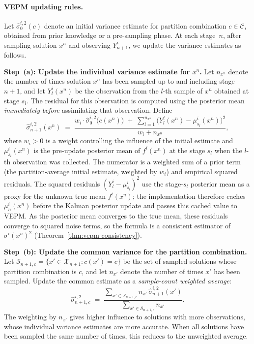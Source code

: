 \documentclass[12pt]{article}
\theoremstyle{plain}
\theoremstyle{definition}
\theoremstyle{remark}
\begin{document}
\paragraph{VEPM updating rules.}
Let $\hat{\sigma}^{i,2}_0(c)$ denote an initial variance estimate for partition combination $c \in \mathcal{C}$, obtained from prior knowledge or a pre-sampling phase. At each stage~$n$, after sampling solution $x^n$ and observing $Y^i_{n+1}$, we update the variance estimates as follows.

\medskip
\noindent\textbf{Step~(a): Update the individual variance estimate for $x^n$.} Let $n_{x^n}$ denote the number of times solution $x^n$ has been sampled up to and including stage $n+1$, and let $Y^i_l(x^n)$ be the observation from the $l$-th sample of $x^n$ obtained at stage $s_l$.  The residual for this observation is computed using the posterior mean \emph{immediately before} assimilating that observation.  Define
\begin{equation}\label{eq:VEPM_individual}
  \hat{\sigma}^{i,2}_{n+1}(x^n) \;=\; \frac{w_i \cdot \hat{\sigma}^{i,2}_0\bigl(c(x^n)\bigr) \;+\; \displaystyle\sum_{l=1}^{n_{x^n}} \bigl(Y^i_l(x^n) - \mu^i_{s_l}(x^n)\bigr)^2}{w_i + n_{x^n}},
\end{equation}
where $w_i > 0$ is a weight controlling the influence of the initial estimate and $\mu^i_{s_l}(x^n)$ is the pre-update posterior mean of $f^i(x^n)$ at the stage $s_l$ when the $l$-th observation was collected.  The numerator is a weighted sum of a prior term (the partition-average initial estimate, weighted by $w_i$) and empirical squared residuals.  The squared residuals $(Y^i_l - \mu^i_{s_l})^2$ use the stage-$s_l$ posterior mean as a proxy for the unknown true mean $f^i(x^n)$; the implementation therefore caches $\mu^i_n(x^n)$ before the Kalman posterior update and passes this cached value to VEPM.  As the posterior mean converges to the true mean, these residuals converge to squared noise terms, so the formula is a consistent estimator of $\sigma^i(x^n)^2$ (Theorem~\ref{thm:vepm-consistency}).

\medskip
\noindent\textbf{Step~(b): Update the common variance for the partition combination.} Let $\mathcal{S}_{n+1,c} = \{x' \in \mathcal{X}_{n+1} : c(x') = c\}$ be the set of sampled solutions whose partition combination is $c$, and let $n_{x'}$ denote the number of times $x'$ has been sampled. Update the common estimate as a \emph{sample-count weighted average}:
\begin{equation}\label{eq:VEPM_common}
  \hat{\sigma}^{i,2}_{n+1,c} \;=\; \frac{\displaystyle\sum_{x' \in \mathcal{S}_{n+1,c}} n_{x'}\, \hat{\sigma}^{i,2}_{n+1}(x')}{\displaystyle\sum_{x' \in \mathcal{S}_{n+1,c}} n_{x'}}.
\end{equation}
The weighting by $n_{x'}$ gives higher influence to solutions with more observations, whose individual variance estimates are more accurate.  When all solutions have been sampled the same number of times, this reduces to the unweighted average.
\end{document}
